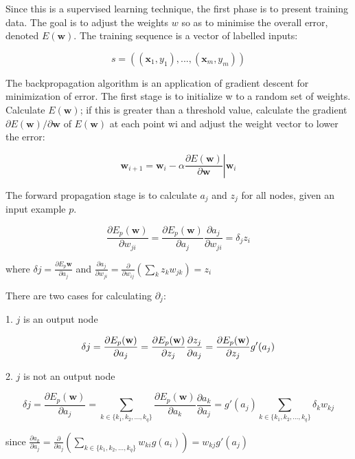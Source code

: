 \documentclass[12pt,a4,notitlepage]{report}
\renewcommand{\_}{\texttt{\symbol{95}}}
\newcommand{\<}{\texttt{\symbol{60}}}
\renewcommand{\>}{\texttt{\symbol{62}}}
\begin{document}
Since this is a supervised learning technique, the first phase is to present training data. The goal is to adjust the weights $w$ so as to minimise the overall error, denoted ${E}(\mathbf w)$. The training sequence is a vector of labelled inputs:

\[ s = ((\mathbf x_1,y_1), ... , (\mathbf x_m, y_m)) \]

The backpropagation algorithm is an application of gradient descent for minimization of error. The first stage is to initialize w to a random set of weights. Calculate $E (\mathbf w)$; if this is greater than a threshold value, calculate the gradient $\partial E (\mathbf w) / \partial \mathbf w $ of $E(\mathbf w )$ at each point wi and adjust the weight vector to lower the error:

\[
\mathbf w_{i+1} = \mathbf w_i - \alpha \left. \frac {\partial E(\mathbf w)} {\partial \mathbf w} \right| \mathbf w_i
\]

The forward propagation stage is to calculate $a_j$ and $z_j$ for all nodes, given an input example $p$.

\[
\frac {\partial E_p(\mathbf w)} {\partial w_{ji}} = \frac {\partial E_p(\mathbf w)} {\partial a_j} \frac {\partial a_j} {\partial w_{ji}} = \delta_j z_i
\]

where $\delta j = \frac {\partial E_p\mathbf w} {\partial a_j}$
and $ \frac {\partial a_j} {\partial w_{ji}} = \frac {\partial} {\partial w_{ij}} \left( \sum_k {z_kw_{jk}} \right) = z_i$

There are two cases for calculating $\partial_j$:

1. $j$ is an output node

\[
\delta j = \frac {\partial E_p (\mathbf w)} {\partial a_j} \\
 = \frac {\partial E_p (\mathbf w)} {\partial z_j} \frac {\partial z_j} {\partial a_j} \\
 = \frac {\partial E_p (\mathbf w)} {\partial z_j}  g'(a_j)
\]

2. $j$ is not an output node

\[
\delta j = \frac {\partial E_p (\mathbf w)} {\partial a_j}
 = \sum_{k \in \{k_1, k_2,\ldots,k_q\}} \frac {\partial E_p (\mathbf w)} {\partial a_k} \frac {\partial a_k} {\partial a_j}
 = g'(a_j) \sum_{k \in \{k_1, k_2,\ldots,k_q\}} {\delta_k w_{kj}}
\]

since $ \frac {\partial a_k} {\partial a_j} = \frac {\partial} {\partial a_j} \left( \sum_{k \in \{k_1, k_2,\ldots,k_q\}} { w_{ki} g(a_i) } \right) = w_{kj} g'(a_j) $
\end{document}
